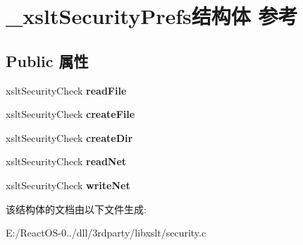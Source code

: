 \hypertarget{struct__xslt_security_prefs}{}\section{\+\_\+xslt\+Security\+Prefs结构体 参考}
\label{struct__xslt_security_prefs}
\subsection*{Public 属性}
\begin{DoxyCompactItemize}
\item 
\mbox{\label{struct__xslt_security_prefs_a34426e051563e3e92a3aeffb6dab51c6}} 
xslt\+Security\+Check {\bfseries read\+File}
\item 
\mbox{\label{struct__xslt_security_prefs_a844197b8c123059a134583aea7cb947e}} 
xslt\+Security\+Check {\bfseries create\+File}
\item 
\mbox{\label{struct__xslt_security_prefs_a84433334d32c0128026d2c2cc8dc7c64}} 
xslt\+Security\+Check {\bfseries create\+Dir}
\item 
\mbox{\label{struct__xslt_security_prefs_a98e5ebb4cc1c3fd49c26e2f23621fbb5}} 
xslt\+Security\+Check {\bfseries read\+Net}
\item 
\mbox{\label{struct__xslt_security_prefs_aa35d574c18266e3e0e1b2ec01e70f1a7}} 
xslt\+Security\+Check {\bfseries write\+Net}
\end{DoxyCompactItemize}


该结构体的文档由以下文件生成\+:\begin{DoxyCompactItemize}
\item 
E\+:/\+React\+O\+S-\/0../dll/3rdparty/libxslt/security.\+c\end{DoxyCompactItemize}
